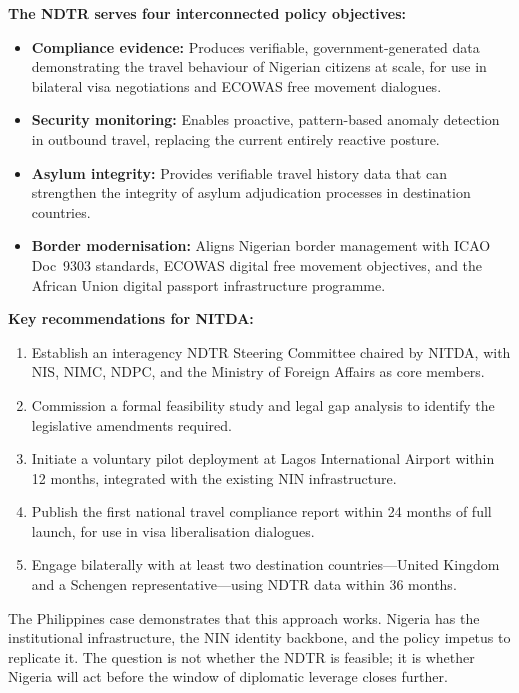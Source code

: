 \documentclass[11pt]{article}
\begin{document}
\textbf{The NDTR serves four interconnected policy objectives:}
\begin{itemize}[leftmargin=*]
    \item \textbf{Compliance evidence:} Produces verifiable, government-generated data
    demonstrating the travel behaviour of Nigerian citizens at scale, for use in bilateral
    visa negotiations and ECOWAS free movement dialogues.
    \item \textbf{Security monitoring:} Enables proactive, pattern-based anomaly detection
    in outbound travel, replacing the current entirely reactive posture.
    \item \textbf{Asylum integrity:} Provides verifiable travel history data that can
    strengthen the integrity of asylum adjudication processes in destination countries.
    \item \textbf{Border modernisation:} Aligns Nigerian border management with ICAO Doc~9303
    standards, ECOWAS digital free movement objectives, and the African Union digital
    passport infrastructure programme.
\end{itemize}

\textbf{Key recommendations for NITDA:}
\begin{enumerate}[leftmargin=*]
    \item Establish an interagency NDTR Steering Committee chaired by NITDA, with
    NIS, NIMC, NDPC, and the Ministry of Foreign Affairs as core members.
    \item Commission a formal feasibility study and legal gap analysis to identify
    the legislative amendments required.
    \item Initiate a voluntary pilot deployment at Lagos International Airport within
    12 months, integrated with the existing NIN infrastructure.
    \item Publish the first national travel compliance report within 24 months of
    full launch, for use in visa liberalisation dialogues.
    \item Engage bilaterally with at least two destination countries---United Kingdom
    and a Schengen representative---using NDTR data within 36 months.
\end{enumerate}

The Philippines case demonstrates that this approach works.
Nigeria has the institutional infrastructure, the NIN identity backbone, and
the policy impetus to replicate it.
The question is not whether the NDTR is feasible; it is whether Nigeria will
act before the window of diplomatic leverage closes further.
\end{document}

